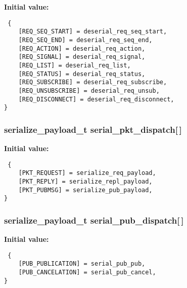 \textbf{Initial value:}

\begin{Code}\begin{verbatim} {
    [REQ_SEQ_START] = deserial_req_seq_start,
    [REQ_SEQ_END] = deserial_req_seq_end,
    [REQ_ACTION] = deserial_req_action,
    [REQ_SIGNAL] = deserial_req_signal,
    [REQ_LIST] = deserial_req_list,
    [REQ_STATUS] = deserial_req_status,
    [REQ_SUBSCRIBE] = deserial_req_subscribe,
    [REQ_UNSUBSCRIBE] = deserial_req_unsub,
    [REQ_DISCONNECT] = deserial_req_disconnect,
}
\end{verbatim}\end{Code}
\subsubsection{\setlength{\rightskip}{0pt plus 5cm}\bf{serialize\_\-payload\_\-t} \bf{serial\_\-pkt\_\-dispatch}[$\,$]\hspace{0.3cm}{\tt  [static]}}\label{upk__v0__protocol__serializer_8c_b62893658685016d54e6832e16c87ec0}


\textbf{Initial value:}

\begin{Code}\begin{verbatim} {
    [PKT_REQUEST] = serialize_req_payload,
    [PKT_REPLY] = serialize_repl_payload,
    [PKT_PUBMSG] = serialize_pub_payload,
}
\end{verbatim}\end{Code}
\subsubsection{\setlength{\rightskip}{0pt plus 5cm}\bf{serialize\_\-payload\_\-t} \bf{serial\_\-pub\_\-dispatch}[$\,$]\hspace{0.3cm}{\tt  [static]}}\label{upk__v0__protocol__serializer_8c_e3ac3b629079d700669a605a446fe25c}


\textbf{Initial value:}

\begin{Code}\begin{verbatim} {
    [PUB_PUBLICATION] = serial_pub_pub,
    [PUB_CANCELATION] = serial_pub_cancel,
}
\end{verbatim}\end{Code}
